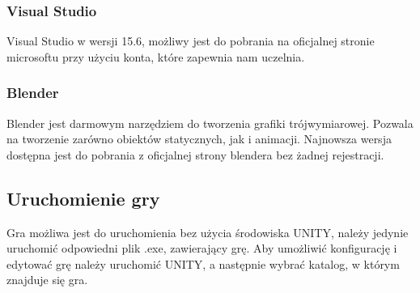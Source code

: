\documentclass{article}
\begin{document}
\subsubsection{Visual Studio }

Visual Studio w wersji 15.6, możliwy jest do pobrania na oficjalnej stronie microsoftu przy użyciu konta, które zapewnia nam uczelnia. 

\subsubsection{Blender }

Blender jest darmowym narzędziem do tworzenia grafiki trójwymiarowej. Pozwala na tworzenie zarówno obiektów statycznych, jak i animacji. Najnowsza wersja dostępna jest do pobrania z oficjalnej strony blendera bez żadnej rejestracji.  

\subsection{Uruchomienie gry}

Gra możliwa jest do uruchomienia bez użycia środowiska UNITY, należy jedynie uruchomić odpowiedni plik .exe, zawierający grę. Aby umożliwić konfigurację i edytować grę należy uruchomić UNITY, a następnie wybrać katalog, w którym znajduje się gra.



%
%
%	
%

\end{document}
